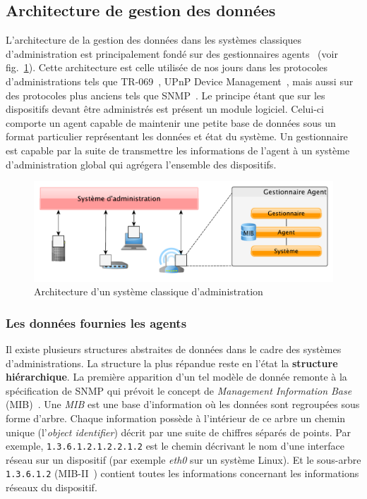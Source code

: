 \subsection{Architecture de gestion des données}
L'architecture de la gestion des données dans les systèmes classiques d'administration est principalement fondé sur des gestionnaires agents~\cite{CCITT:X700} (voir fig.~\ref{fig:rw:supervision:administration}). Cette architecture est celle utilisée de nos jours dans les protocoles d'administrations tels que TR-069~\cite{BBF:tr069}, UPnP Device Management~\cite{UPnP:MD}, mais aussi sur des protocoles plus anciens tels que SNMP~\cite{IETF:SNMP}. Le principe étant que sur les dispositifs devant être administrés est présent un module logiciel. Celui-ci comporte un agent capable de maintenir une petite base de données sous un format particulier représentant les données et état du système. Un gestionnaire est capable par la suite de transmettre les informations de l'agent à un système d'administration global qui agrégera l'ensemble des dispositifs.
\begin{figure}[ht]
    \centering
    \includegraphics[width=.75\textwidth]{fig/rw-supervision-administration}
    \caption{Architecture d'un système classique d'administration}\label{fig:rw:supervision:administration}
\end{figure}

\subsubsection{Les données fournies les agents}
Il existe plusieurs structures abstraites de données dans le cadre des systèmes d'administrations. La structure la plus répandue reste en l'état la \textbf{structure hiérarchique}. La première apparition d'un tel modèle de donnée remonte à la spécification de SNMP qui prévoit le concept de \textit{Management Information Base} (MIB)~\cite{IETF:MIB}. Une \textit{MIB} est une base d'information où les données sont regroupées sous forme d'arbre. Chaque information possède à l'intérieur de ce arbre un chemin unique (l'\textit{object identifier}) décrit par une suite de chiffres séparés de points. Par exemple, \verb|1.3.6.1.2.1.2.2.1.2| est le chemin décrivant le nom d'une interface réseau sur un dispositif (par exemple \textit{eth0} sur un système Linux). Et le sous-arbre \verb|1.3.6.1.2| (MIB-II~\cite{IETF:MIB-II}) contient toutes les informations concernant les informations réseaux du dispositif.

